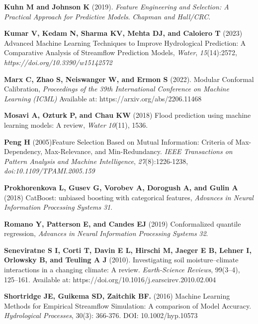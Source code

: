 \documentclass[ruler]{CUP-JNL-EDS}%
\begin{document}
\begin{Backmatter}
\begin{thebibliography}{}
\textbf{Kuhn M and Johnson K} (2019). \textit{Feature Engineering and Selection: A Practical Approach for Predictive Models}. \textit{Chapman and Hall/CRC}.

\textbf{Kumar V, Kedam N, Sharma KV, Mehta DJ, and Caloiero T} (2023) Advanced Machine Learning Techniques to Improve Hydrological Prediction: A Comparative Analysis of Streamflow Prediction Models, \textit{Water}, \textit{15}(14):2572, \textit{https://doi.org/10.3390/w15142572}

\textbf{Marx C, Zhao S, Neiswanger W, and Ermon S} (2022). Modular Conformal Calibration, \textit{Proceedings of the 39th International Conference on Machine Learning (ICML)} Available at: https://arxiv.org/abs/2206.11468

\textbf{Mosavi A, Ozturk P, and Chau KW} (2018) Flood prediction using machine learning models: A review, \textit{Water} \textit{10}(11), {1536}.

\textbf{Peng H} (2005)Feature Selection Based on Mutual Information: Criteria of Max-Dependency, Max-Relevance, and Min-Redundancy. \textit{IEEE Transactions on Pattern Analysis and Machine Intelligence}, \textit{27}(8):1226-1238, \textit{doi:10.1109/TPAMI.2005.159}

\textbf{Prokhorenkova L, Gusev G, Vorobev A, Dorogush A, and Gulin A} (2018) CatBoost: unbiased boosting with categorical features, \textit{Advances in Neural Information Processing Systems} \textit{31}.

\textbf{Romano Y, Patterson E, and Candes EJ} (2019) Conformalized quantile regression, \textit{Advances in Neural Information Processing Systems} \textit{32}.

\textbf{Seneviratne S I, Corti T, Davin E L, Hirschi M, Jaeger E B, Lehner I, Orlowsky B, and Teuling A J} (2010). Investigating soil moisture–climate interactions in a changing climate: A review. \textit{Earth-Science Reviews}, 99(3–4), 125–161. Available at: https://doi.org/10.1016/j.earscirev.2010.02.004

\textbf{Shortridge JE, Guikema SD, Zaitchik BF.} (2016) Machine Learning Methods for Empirical Streamflow Simulation: A comparison of Model Accuracy. \textit{Hydrological Processes}, 30(3): 366-376. DOI: 10.1002/hyp.10573


\end{thebibliography}
\end{Backmatter}
\end{document}
